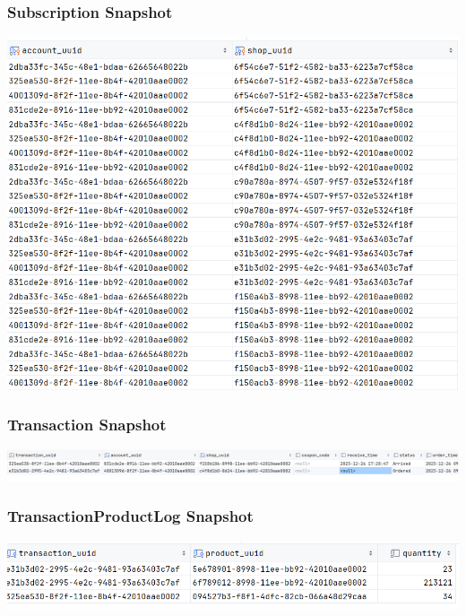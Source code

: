 \documentclass[a4paper, 12pt]{article}
\begin{document}
\subsubsection{Subscription Snapshot}
\includegraphics[scale=0.4]{snapshots/subscription.png}
\subsubsection{Transaction Snapshot}
\includegraphics[scale=0.4]{snapshots/transaction.png}
\subsubsection{TransactionProductLog Snapshot}
\includegraphics[scale=0.4]{snapshots/transactionProductLog.png}
\end{document}

